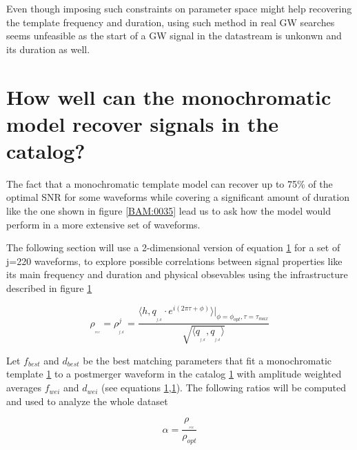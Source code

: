 Even though imposing such constraints on parameter space might help recovering the template frequency and duration, using such method in real GW searches seems unfeasible as the start of a GW signal in the datastream is unkonwn and its duration as well.

\newpage
\section{How well can the monochromatic model recover signals in the catalog?}


The fact that a monochromatic template model can recover up to 75\% of the optimal SNR for some waveforms while covering a significant amount of duration like the one shown in figure \ref{BAM:0035} lead us to ask how the model would perform in a more extensive set of waveforms. 


The following section will use a 2-dimensional version of equation \ref{} for a set of j=220 waveforms, to explore possible correlations between signal properties like its main frequency and duration and physical obsevables  using the infrastructure described in figure \ref{}

\begin{equation}\label{eq:21}
\rho_{_{_{rec}}} = \rho^j_{_{_{f,d}}} = \frac{\langle h, q_{_{_{f,d}}}\cdot e^{i(2\pi \tau+\phi)}\rangle \bigg\rvert_{\phi =\phi_{opt},\tau =\tau_{max}}}{\sqrt{\langle  q_{_{_{f,d}}},q_{_{_{f,d}}} \rangle}}
\end{equation}




Let $f_{best}$ and $d_{best}$ be the best matching parameters that fit a monochromatic template \ref{} to a postmerger waveform in the catalog \ref{} with amplitude weighted averages $f_{wei}$ and $d_{wei}$ (see equations \ref{},\ref{}). The following ratios will be computed and used to analyze the whole dataset 


\begin{equation}\label{alpha}
\alpha = \frac{\rho_{_{_{rec}}}}{\rho_{opt}}
\end{equation}

